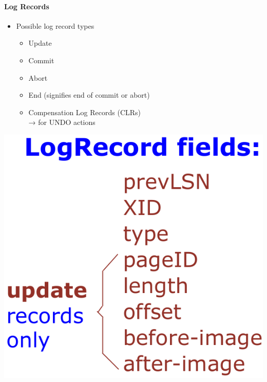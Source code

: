 \paragraph{Log Records}
\begin{minipage}{0.3\textwidth}
  \begin{itemize}
  \item Possible log record types
    \begin{itemize}
    \item Update
    \item Commit
    \item Abort
    \item End (signifies end of commit or abort)
    \item Compensation Log Records (CLRs) \\
      → for UNDO actions
    \end{itemize}
  \end{itemize}
\end{minipage}%
\begin{minipage}{0.2\textwidth}
  \includegraphics[scale=0.13]{graphics/log-record-fields.png}
\end{minipage}



